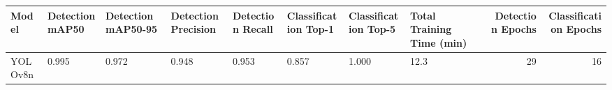 \begin{tabular}{llllllllrr}
\toprule
Model & Detection mAP50 & Detection mAP50-95 & Detection Precision & Detection Recall & Classification Top-1 & Classification Top-5 & Total Training Time (min) & Detection Epochs & Classification Epochs \\
\midrule
YOLOv8n & 0.995 & 0.972 & 0.948 & 0.953 & 0.857 & 1.000 & 12.3 & 29 & 16 \\
\bottomrule
\end{tabular}
